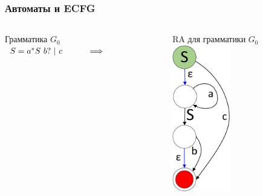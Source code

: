 \documentclass{beamer}
\begin{document}
	\begin{frame} 
		\frametitle{Автоматы и ECFG}
		
		\begin{columns}
			\begin{column}{4cm}
				Грамматика $G_0$\\
				\vspace{10pt}
				$
				\begin{array}[b]{rl}
				S = a^{*} S\ b? \ | \ c \ \ \ \ \ \ \ \ \  \Longrightarrow
				\end{array}
				$
			\end{column}
			\begin{column}{3.3cm}
				RA для грамматики $G_0$\\
				\vspace{10pt}
				\includegraphics[width=2.5cm]{pictures/G0initialAutomaton.pdf}
			\end{column}
		\end{columns}
	\end{frame}
\end{document}
